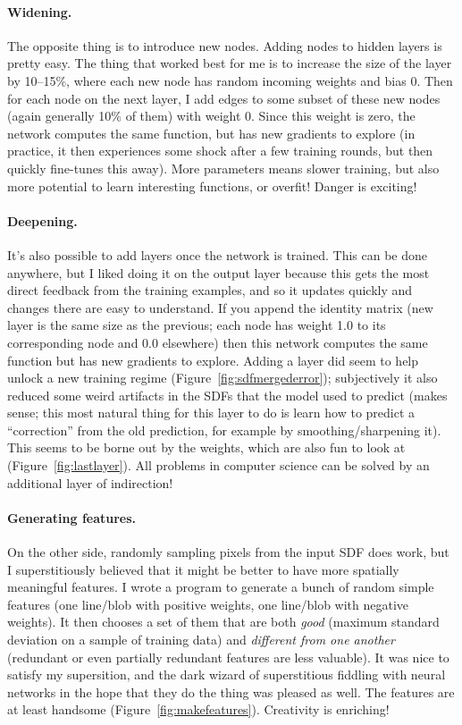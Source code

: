 \documentclass[twocolumn]{article}
\begin{document}
\paragraph{Widening.} The opposite thing is to introduce new nodes.
Adding nodes to hidden layers is pretty easy. The thing that worked
best for me is to increase the size of the layer by 10--15\%, where
each new node has random incoming weights and bias 0. Then for each
node on the next layer, I add edges to some subset of these new nodes
(again generally 10\% of them) with weight 0. Since this weight is
zero, the network computes the same function, but has new gradients
to explore (in practice, it then experiences some shock after a
few training rounds, but then quickly fine-tunes this away). More
parameters means slower training, but also more potential to learn
interesting functions, or overfit! Danger is exciting!

\paragraph{Deepening.} It's also possible to add layers once the
network is trained. This can be done anywhere, but I liked doing it on
the output layer because this gets the most direct feedback from the
training examples, and so it updates quickly and changes there are
easy to understand. If you append the identity matrix (new layer is
the same size as the previous; each node has weight 1.0 to its
corresponding node and 0.0 elsewhere) then this network computes
the same function but has new gradients to explore. Adding a layer
did seem to help unlock a new training regime
(Figure~\ref{fig:sdfmergederror}); subjectively it also reduced
some weird artifacts in the SDFs that the model used to predict (makes
sense; this most natural thing for this layer to do is learn how to
predict a ``correction'' from the old prediction, for example
by smoothing/sharpening it). This seems to be borne out by the
weights, which are also fun to look at (Figure~\ref{fig:lastlayer}).
All problems in computer science can be solved by an additional
layer of indirection!

\paragraph{Generating features.} On the other side, randomly sampling
pixels from the input SDF does work, but I superstitiously believed
that it might be better to have more spatially meaningful features. I
wrote a program to generate a bunch of random simple features (one
line/blob with positive weights, one line/blob with negative weights).
It then chooses a set of them that are both {\em good} (maximum
standard deviation on a sample of training data) and {\em different
  from one another} (redundant or even partially redundant features
are less valuable). It was nice to satisfy my supersition, and the
dark wizard of superstitious fiddling with neural networks in the
hope that they do the thing was pleased as well. The features are
at least handsome (Figure~\ref{fig:makefeatures}). Creativity is
enriching!
\end{document}
